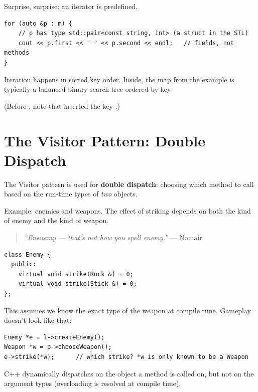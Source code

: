 Surprise, surprise: an iterator is predefined.
\begin{lstlisting}[style=cpp]
for (auto &p : m) {
    // p has type std::pair<const string, int> (a struct in the STL)
    cout << p.first << " " << p.second << endl;   // fields, not methods
}
\end{lstlisting}
Iteration happens in sorted key order.
Inside, the map from the example is typically a balanced binary search tree ordered by key:
\begin{center}

\small (Before ; note that  inserted the key .)
\end{center}

\section{The Visitor Pattern: Double Dispatch}
The Visitor pattern is used for \textbf{double dispatch}: choosing which method to
call based on the run-time types of \emph{two} objects.

Example: enemies and weapons. The effect of striking depends on both the kind of
enemy and the kind of weapon.
\begin{quote}
\textit{``Enenemy --- that's not how you spell enemy.''} --- Nomair
\end{quote}
\begin{lstlisting}[style=cpp]
class Enemy {
  public:
    virtual void strike(Rock &) = 0;
    virtual void strike(Stick &) = 0;
};
\end{lstlisting}
This assumes we know the exact type of the weapon at compile time. Gameplay
doesn't look like that:
\begin{lstlisting}[style=cpp]
Enemy *e = l->createEnemy();
Weapon *w = p->chooseWeapon();
e->strike(*w);      // which strike? *w is only known to be a Weapon
\end{lstlisting}
C++ dynamically dispatches on the object a method is called on, but not on the
argument types (overloading is resolved at compile time).

